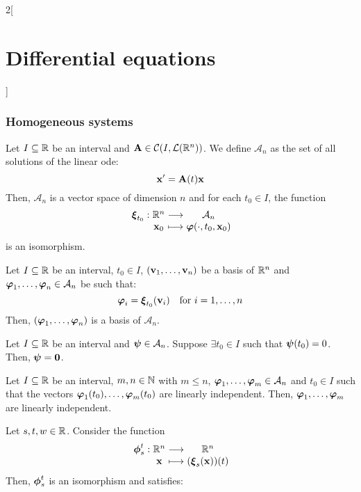 \documentclass[../../../main.tex]{subfiles}
\begin{document}
\begin{multicols}{2}[\section{Differential equations}]
  \subsubsection{Homogeneous systems}
  \begin{theorem}
    Let $I\subseteq\mathbb{R}$ be an interval and $\boldsymbol{\mathrm{A}}\in\mathcal{C}(I,\mathcal{L}(\mathbb{R}^n))$. We define $\mathcal{A}_n$ as the set of all solutions of the linear ode:
    \begin{equation}\label{DE_homo}
      \boldsymbol{\mathrm{x}}'=\boldsymbol{\mathrm{A}}(t)\boldsymbol{\mathrm{x}}
    \end{equation} Then, $\mathcal{A}_n$ is a vector space of dimension $n$ and for each $t_0\in I$, the function
    $$
      \function{\vectorfunction{\xi}_{t_0}}{\RR^n}{\mathcal{A}_n}{\vectorfunction{x}_0}{\vectorfunction{\varphi}(\cdot,t_0,\vectorfunction{x}_0)}
    $$
    is an isomorphism.
  \end{theorem}
  \begin{corollary}
    Let $I\subseteq\mathbb{R}$ be an interval, $t_0\in I$, $(\boldsymbol{\mathrm{v}}_1,\ldots,\boldsymbol{\mathrm{v}}_n)$ be a basis of $\mathbb{R}^n$ and $\boldsymbol{\mathrm{\varphi}}_1,\ldots,\boldsymbol{\mathrm{\varphi}}_n\in\mathcal{A}_n$ be such that: $$\boldsymbol{\mathrm{\varphi}}_i=\boldsymbol{\mathrm{\xi}}_{t_0}(\boldsymbol{\mathrm{v}}_i)\quad\text{for } i=1,\ldots,n$$
    Then, $(\boldsymbol{\mathrm{\varphi}}_1,\ldots,\boldsymbol{\mathrm{\varphi}}_n)$ is a basis of $\mathcal{A}_n$.
  \end{corollary}
  \begin{corollary}
    Let $I\subseteq\mathbb{R}$ be an interval and $\boldsymbol{\mathrm{\psi}}\in\mathcal{A}_n$. Suppose $\exists t_0\in I$ such that $\boldsymbol{\mathrm{\psi}} (t_0)=0$. Then, $\boldsymbol{\mathrm{\psi}}=\boldsymbol{\mathrm{0}}$.
  \end{corollary}
  \begin{corollary}
    Let $I\subseteq\mathbb{R}$ be an interval, $m,n\in\mathbb{N}$ with $m\leq n$, $\boldsymbol{\mathrm{\varphi}}_1,\ldots,\boldsymbol{\mathrm{\varphi}}_m\in\mathcal{A}_n$ and $t_0\in I$ such that the vectors $\boldsymbol{\mathrm{\varphi}}_1(t_0),\ldots,\boldsymbol{\mathrm{\varphi}}_m(t_0)$ are linearly independent. Then, $\boldsymbol{\mathrm{\varphi}}_1,\ldots,\boldsymbol{\mathrm{\varphi}}_m$ are linearly independent.
  \end{corollary}
  \begin{corollary}
    Let $s,t,w\in\mathbb{R}$. Consider the function
    $$
      \function{\vectorfunction{\phi}_s^t}{\RR^n}{\RR^n}{\vectorfunction{x}}{(\vectorfunction{\xi}_s(\vectorfunction{x}))(t)}
    $$
    Then, $\boldsymbol{\mathrm{\phi}}_s^t$ is an isomorphism and satisfies:

\end{corollary}
\end{multicols}
\end{document}
